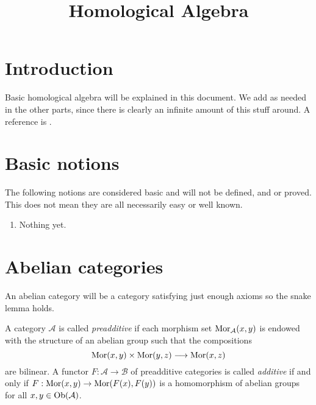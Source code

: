 

%


\title{Homological Algebra}


\maketitle

\label{section-phantom}

\tableofcontents

\section{Introduction}
\label{section-introduction}

\noindent
Basic homological algebra will be explained in this document.
We add as needed in the other parts, since there is clearly
an infinite amount of this stuff around.
A reference is \cite{Maclane}.

\section{Basic notions}
\label{section-topology-basic}

\noindent
The following notions are considered basic and will not be defined,
and or proved. This does not mean they are all necessarily easy or
well known.

\begin{enumerate}
\item Nothing yet.
\end{enumerate}


\section{Abelian categories}
\label{section-abelian-categories}

\noindent
An abelian category will be a category satisfying
just enough axioms so the snake lemma holds.

\begin{definition}
\label{definition-preadditive}
A category $\mathcal{A}$ is called {\it preadditive} if each
morphism set $\mathop{\rm Mor}\nolimits_\mathcal{A}(x, y)$ is endowed
with the structure of an abelian group such that the
compositions
$$
\mathop{\rm Mor}\nolimits(x, y) \times \mathop{\rm Mor}\nolimits(y, z)
\longrightarrow
\mathop{\rm Mor}\nolimits(x, z)
$$
are bilinear. A functor $F : \mathcal{A} \to \mathcal{B}$ of
preadditive categories is called {\it additive} if and only
if $F : \mathop{\rm Mor}\nolimits(x, y) \to \mathop{\rm Mor}\nolimits(F(x), F(y))$
is a homomorphism of abelian groups for all
$x, y \in \mathop{\rm Ob}\nolimits(\mathcal{A})$.
\end{definition}

